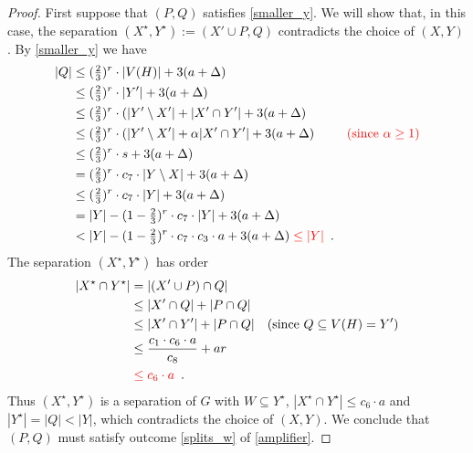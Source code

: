 \documentclass{patmorin}
\begin{document}
\begin{proof}
  First suppose that $(P,Q)$ satisfies \cref{smaller_y}.  We will show that, in this case, the separation $(X^\star,Y^\star):=(X'\cup P,Q)$ contradicts the choice of $(X,Y)$. By \cref{smaller_y} we have
  \begin{align*}
    |Q| & \le (\tfrac{2}{3})^r\cdot |V(H)| + 3(a+\Delta) \\
    & \le (\tfrac{2}{3})^r\cdot |Y'| + 3(a+\Delta) \\
    & \le (\tfrac{2}{3})^r\cdot (|Y'\setminus X'|+|X'\cap Y'| + 3(a+\Delta) \\
    & \le (\tfrac{2}{3})^r\cdot (|Y'\setminus X'|+\alpha|X'\cap Y'| + 3(a+\Delta) & \mathcolor{red}{\text{(since $\alpha \ge 1$)}} \\
    & \le (\tfrac{2}{3})^r\cdot s + 3(a+\Delta) \\
    & = (\tfrac{2}{3})^r\cdot c_7\cdot|Y\setminus X| + 3(a+\Delta) \\
    & \le (\tfrac{2}{3})^r\cdot c_7\cdot |Y| + 3(a+\Delta) \\
    & = |Y|-(1-\tfrac{2}{3})^r\cdot c_7\cdot|Y| + 3(a+\Delta) \\
    & < |Y|-(1-\tfrac{2}{3})^r\cdot c_7\cdot c_3\cdot a + 3(a+\Delta)
    \mathcolor{red}{\le |Y|} \enspace .
  \end{align*}
  The separation $(X^\star,Y^\star)$ has order
  \begin{align*}
    |X^\star\cap Y^\star|
      & = |(X'\cup P)\cap Q| \\
      & \le |X'\cap Q| + |P\cap Q| \\
      & \le |X'\cap Y'| + |P\cap Q| & \text{(since $Q\subseteq V(H)=Y'$)}\\
      & \le \frac{c_1\cdot c_6\cdot a}{c_8} + ar \\
      & \mathcolor{red}{\le c_6\cdot a}  \enspace .
  \end{align*}
  Thus $(X^\star,Y^\star)$ is a separation of $G$ with $W\subseteq Y^\star$, $|X^\star\cap Y^\star|\le c_6\cdot a$ and $|Y^\star|=|Q|<|Y|$, which contradicts the choice of $(X,Y)$.  We conclude that $(P,Q)$ must satisfy outcome \cref{splits_w} of \cref{amplifier}.


\end{proof}
\end{document}
